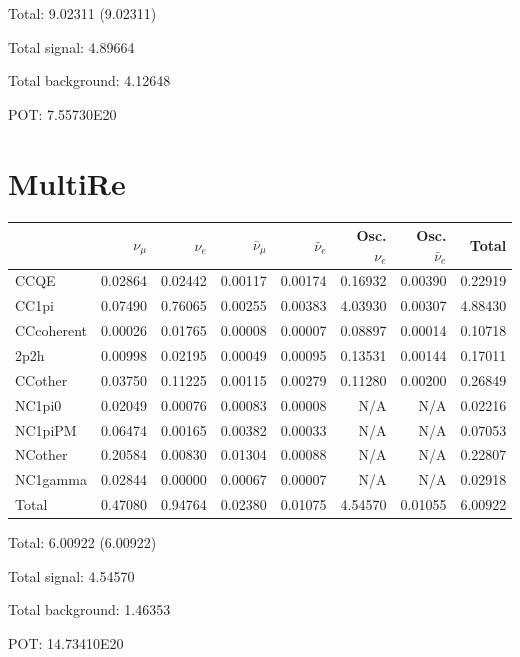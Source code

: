 \documentclass[10pt,a4paper]{article}
\begin{document}
Total: 9.02311    (9.02311)


Total signal: 4.89664


Total background: 4.12648

POT: 7.55730E20



\clearpage


\section*{MultiRe}
\begin{tabular} { | l ||r | r | r | r | r | r | | r | }
\hline
              & $\nu_\mu$            & $\nu_e$              & $\bar{\nu}_{\mu}$    & $\bar{\nu}_{e}$      & Osc. $\nu_e$         & Osc. $\bar{\nu}_{e}$ & Total                \\ \hline\hline
 CCQE         & 0.02864              & 0.02442              & 0.00117              & 0.00174              & 0.16932              & 0.00390              & 0.22919              \\ \hline
 CC1pi        & 0.07490              & 0.76065              & 0.00255              & 0.00383              & 4.03930              & 0.00307              & 4.88430              \\ \hline
 CCcoherent   & 0.00026              & 0.01765              & 0.00008              & 0.00007              & 0.08897              & 0.00014              & 0.10718              \\ \hline
 2p2h         & 0.00998              & 0.02195              & 0.00049              & 0.00095              & 0.13531              & 0.00144              & 0.17011              \\ \hline
 CCother      & 0.03750              & 0.11225              & 0.00115              & 0.00279              & 0.11280              & 0.00200              & 0.26849              \\ \hline
 NC1pi0       & 0.02049              & 0.00076              & 0.00083              & 0.00008              & N/A                  & N/A                  & 0.02216              \\ \hline
 NC1piPM      & 0.06474              & 0.00165              & 0.00382              & 0.00033              & N/A                  & N/A                  & 0.07053              \\ \hline
 NCother      & 0.20584              & 0.00830              & 0.01304              & 0.00088              & N/A                  & N/A                  & 0.22807              \\ \hline
 NC1gamma     & 0.02844              & 0.00000              & 0.00067              & 0.00007              & N/A                  & N/A                  & 0.02918              \\ \hline
\hline
 Total        & 0.47080              & 0.94764              & 0.02380              & 0.01075              & 4.54570              & 0.01055              & 6.00922              \\ \hline

\end{tabular}

Total: 6.00922    (6.00922)


Total signal: 4.54570


Total background: 1.46353

POT: 14.73410E20
\end{document}
